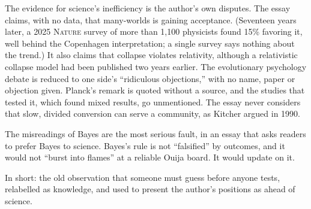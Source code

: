 \begin{afterword}
The evidence for science's inefficiency is the author's own disputes. The essay claims, with no data, that many-worlds is gaining acceptance. (Seventeen years later, a 2025 \textsc{Nature} survey of more than 1,100 physicists found 15\% favoring it, well behind the Copenhagen interpretation; a single survey says nothing about the trend.) It also claims that collapse violates relativity, although a relativistic collapse model had been published two years earlier. The evolutionary psychology debate is reduced to one side's ``ridiculous objections,'' with no name, paper or objection given. Planck's remark is quoted without a source, and the studies that tested it, which found mixed results, go unmentioned. The essay never considers that slow, divided conversion can serve a community, as Kitcher argued in 1990.

The misreadings of Bayes are the most serious fault, in an essay that asks readers to prefer Bayes to science. Bayes's rule is not ``falsified'' by outcomes, and it would not ``burst into flames'' at a reliable Ouija board. It would update on it.

In short: the old observation that someone must guess before anyone tests, relabelled as knowledge, and used to present the author's positions as ahead of science.
\end{afterword}
